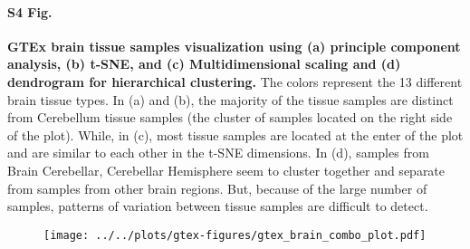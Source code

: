 \documentclass[10pt,letterpaper]{article}
\begin{document}
\paragraph*{S4 Fig.}

\label{figS4}
{\bf GTEx brain tissue samples visualization using (a) principle component analysis, (b) t-SNE, and (c) Multidimensional scaling and (d) dendrogram for hierarchical clustering.}
The colors represent the 13 different brain tissue types. In (a) and (b), the majority of the tissue samples are distinct from Cerebellum tissue samples (the cluster of samples located on the right side of the plot). While, in (c), most tissue samples are located at the enter of the plot and are similar to each other in the t-SNE dimensions. In (d), samples from Brain Cerebellar, Cerebellar Hemisphere seem to cluster together and separate from samples from other brain regions. But, because of the large number of samples, patterns of variation between tissue samples are difficult to detect.

\begin{figure}[ht]
\centering
\texttt{[image: ../../plots/gtex-figures/gtex\_brain\_combo\_plot.pdf]}
\end{figure}
\end{document}
